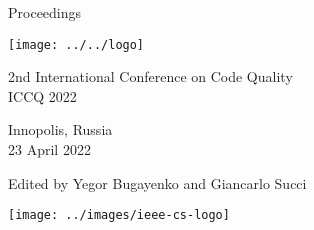\thispagestyle{empty}
\begin{center}
Proceedings

\vspace{1in}

\texttt{[image: ../../logo]}

\vspace{0.5in}

{\Large 2nd International Conference on Code Quality\\[12pt]
ICCQ 2022}

\vspace{0.5in}

Innopolis, Russia\\
23 April 2022

\vspace{0.5in}

Edited by Yegor Bugayenko and Giancarlo Succi

\vspace{1.5in}




\texttt{[image: ../images/ieee-cs-logo]}

\end{center}

